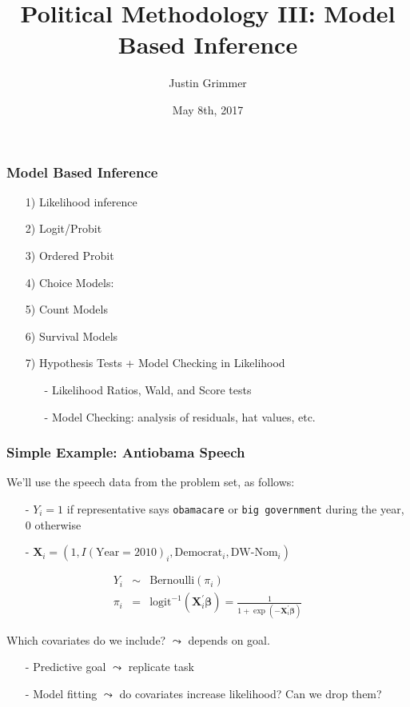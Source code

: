 \documentclass{beamer}
\title[Methodology III] %
{Political Methodology III: Model Based Inference}
\author{Justin Grimmer}
\institute[Stanford University]{Associate Professor\\Department of Political Science \\  Stanford University}
\date{May 8th, 2017}
\begin{document}
\begin{frame}
\titlepage
\end{frame}


\begin{frame}
\frametitle{Model Based Inference}

\begin{itemize}
\item[1)] Likelihood inference
\item[2)] Logit/Probit
\item[3)] Ordered Probit
\item[4)] Choice Models:
\item[5)] Count Models
\item[6)] Survival Models
\item[7)] \alert{Hypothesis Tests + Model Checking in Likelihood}
\begin{itemize}
\item[-] Likelihood Ratios, Wald, and Score tests
\item[-] Model Checking: analysis of residuals, hat values, etc.
\end{itemize}
\end{itemize}

\end{frame}


\begin{frame}
\frametitle{Simple Example: Antiobama Speech}

We'll  use the speech data from the problem set, as follows:

\begin{itemize}
\item[-] $Y_{i} = 1 $ if representative says {\tt obamacare} or {\tt big government} during the year, 0 otherwise
\item[-] $\boldsymbol{X}_{i} = (1, I(\text{Year} = 2010)_{i}, \text{Democrat}_{i}, \text{DW-Nom}_{i}) $
\end{itemize}

\begin{eqnarray}
Y_{i}  &  \sim &   \text{Bernoulli}(\pi_{i}) \nonumber \\
\pi_{i}     & = & \text{logit}^{-1}(\boldsymbol{X}_{i}^{'} \boldsymbol{\beta})  = \frac{1}{1 + \exp(-\boldsymbol{X}_{i}^{'} \boldsymbol{\beta}) } \nonumber
\end{eqnarray}


Which covariates do we include? $\leadsto$ depends on goal.  \\
\begin{itemize}
\item[-] Predictive goal $\leadsto$ replicate task
\item[-] Model fitting $\leadsto$ do covariates increase likelihood? Can we drop them?
\end{itemize}

\end{frame}
\end{document}
